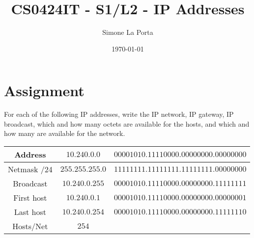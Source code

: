 \documentclass{article}
\title{CS0424IT - S1/L2 - IP Addresses} %
\author{Simone La Porta} %
\date{\today}
\begin{document}
\maketitle

\section*{Assignment}
For each of the following IP addresses, write the IP network, IP gateway,
IP broadcast, which and how many octets are available for the hosts, 
and which and how many are available for the network.

\begin{warn}
  \begin{tabular}{ | c | c | c | }
    \hline
    Address & $10.240.0.0$ & $00001010.11110000.00000000.00000000$ \\ 
    \hline
    Netmask /24 & $255.255.255.0$ & $11111111.11111111.11111111.00000000$ \\ 
    \hline
    Broadcast & $10.240.0.255$ & $00001010.11110000.00000000.11111111$ \\ 
    \hline
    First host & $10.240.0.1$ & $00001010.11110000.00000000.00000001$ \\
    \hline
    Last host & $10.240.0.254$ & $00001010.11110000.00000000.11111110$ \\
    \hline
    Hosts/Net & $254$ & \\
    \hline
  \end{tabular}
\end{warn}
\end{document}
